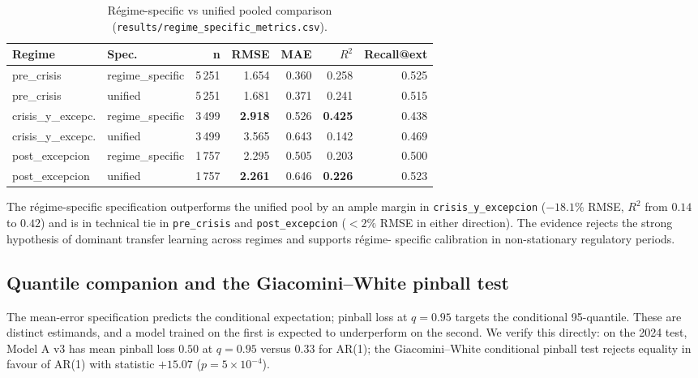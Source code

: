 \documentclass[11pt,a4paper]{article}
\begin{document}
\begin{table}[H]
\centering
\small
\caption{Régime-specific vs unified pooled comparison
(\texttt{results/regime\_specific\_metrics.csv}).}
\label{tab:t3}
\begin{tabular}{llrrrrr}
\toprule
\textbf{Regime} & \textbf{Spec.} & \textbf{n} & \textbf{RMSE} &
\textbf{MAE} & \textbf{$R^2$} & \textbf{Recall@ext} \\
\midrule
pre\_crisis        & regime\_specific & 5\,251 & 1.654 & 0.360 & 0.258 & 0.525 \\
pre\_crisis        & unified          & 5\,251 & 1.681 & 0.371 & 0.241 & 0.515 \\
crisis\_y\_excepc. & regime\_specific & 3\,499 & \textbf{2.918} & 0.526 & \textbf{0.425} & 0.438 \\
crisis\_y\_excepc. & unified          & 3\,499 & 3.565 & 0.643 & 0.142 & 0.469 \\
post\_excepcion    & regime\_specific & 1\,757 & 2.295 & 0.505 & 0.203 & 0.500 \\
post\_excepcion    & unified          & 1\,757 & \textbf{2.261} & 0.646 & \textbf{0.226} & 0.523 \\
\bottomrule
\end{tabular}
\end{table}

The régime-specific specification outperforms the unified pool by an
ample margin in \texttt{crisis\_y\_excepcion} ($-18.1\%$ RMSE,
$R^2$ from $0.14$ to $0.42$) and is in technical tie in
\texttt{pre\_crisis} and \texttt{post\_excepcion} ($< 2\%$ RMSE in
either direction). The evidence rejects the strong hypothesis of
dominant transfer learning across regimes and supports régime-
specific calibration in non-stationary regulatory periods.

\subsection{Quantile companion and the Giacomini--White pinball
test}\label{sec:gw-pinball}

The mean-error specification predicts the conditional expectation;
pinball loss at $q = 0.95$ targets the conditional 95-quantile.
These are distinct estimands, and a model trained on the first is
expected to underperform on the second. We verify this directly:
on the 2024 test, Model A v3 has mean pinball loss
$0.50$ at $q = 0.95$ versus $0.33$ for AR(1); the Giacomini--White
conditional pinball test \citep{Giacomini2006} rejects equality in
favour of AR(1) with statistic $+15.07$ ($p = 5 \times 10^{-4}$).
\end{document}
